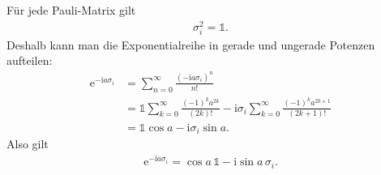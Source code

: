 \documentclass[11pt,a4paper]{scrartcl}
\newcommand{\e}{\mathrm e}
\newcommand{\ii}{\mathrm i}
\begin{document}
\begin{enumerate}[label=(\alph*)]
\begin{calculationbox}
            \begin{calculationbox}[title=Exponentialformel für Pauli-Matrizen]
                Für jede Pauli-Matrix gilt
                \begin{align*}
                    \sigma_i^2=\mathbb{1}.
                \end{align*}
                Deshalb kann man die Exponentialreihe in gerade und ungerade Potenzen aufteilen:
                \begin{align*}
                    \e^{-\ii a\sigma_i}
                    &=
                    \sum_{n=0}^{\infty}\frac{(-\ii a\sigma_i)^n}{n!}\\
                    &=
                    \mathbb{1}
                    \sum_{k=0}^{\infty}
                    \frac{(-1)^k a^{2k}}{(2k)!}
                    -
                    \ii\sigma_i
                    \sum_{k=0}^{\infty}
                    \frac{(-1)^k a^{2k+1}}{(2k+1)!}\\
                    &=
                    \mathbb{1}\cos a-\ii\sigma_i\sin a.
                \end{align*}
                Also gilt
                \begin{align*}
                    \e^{-\ii a\sigma_i}
                    =
                    \cos a\,\mathbb{1}
                    -
                    \ii\sin a\,\sigma_i.
                \end{align*}
            \end{calculationbox}


\end{calculationbox}
\end{enumerate}
\end{document}
